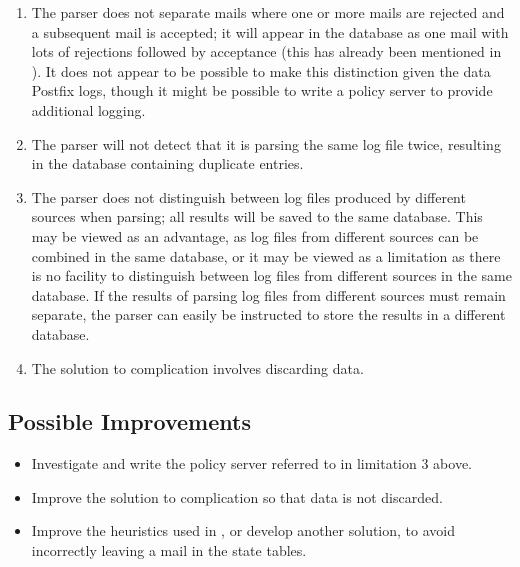 \begin{enumerate}
    \item The parser does not separate mails where one or more mails are
        rejected and a subsequent mail is accepted; it will appear in the
        database as one mail with lots of rejections followed by acceptance
        (this has already been mentioned in ).
        It does not appear to be possible to make this distinction given
        the data Postfix logs, though it might be possible to write a
        policy server to provide additional logging.

    \item The parser will not detect that it is parsing the same log file
        twice, resulting in the database containing duplicate entries.

    \item The parser does not distinguish between log files produced by
        different sources when parsing; all results will be saved to the
        same database.  This may be viewed as an advantage, as log files
        from different sources can be combined in the same database, or it
        may be viewed as a limitation as there is no facility to
        distinguish between log files from different sources in the same
        database.  If the results of parsing log files from different
        sources must remain separate, the parser can easily be instructed
        to store the results in a different database.

    \item The solution to complication  involves discarding data.

\end{enumerate}

\subsection{Possible Improvements}

\begin{itemize}

    \item Investigate and write the policy server referred to in limitation
        3 above.

    \item Improve the solution to complication  so that data is not discarded.

    \item Improve the heuristics used in , or develop another solution, to avoid incorrectly leaving a
        mail in the state tables.

\end{itemize}



